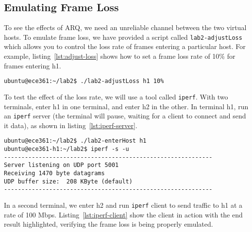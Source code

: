 \documentclass[11pt]{article}
\begin{document}

\subsection{Emulating Frame Loss}
To see the effects of ARQ, we need an unreliable channel between the two virtual hosts.
To emulate frame loss, we have provided a script called \texttt{lab2-adjustLoss} which allows you to control the loss rate of frames entering a particular host.
For example, listing~\ref{lst:adjust-loss} shows how to set a frame loss rate of 10\% for frames entering h1.


\begin{lstlisting}[style=ece361shell, caption={Emulating 10\% frame loss for frames entering h1.}, label={lst:adjust-loss}]
ubuntu@ece361:~/lab2$ ./lab2-adjustLoss h1 10%
\end{lstlisting}

To test the effect of the loss rate, we will use a tool called \texttt{iperf}.
With two terminals, enter h1 in one terminal, and enter h2 in the other.
In terminal h1, run an \texttt{iperf} server (the terminal will pause, waiting for a client to connect and send it data), as shown in listing~\ref{lst:iperf-server}.

\begin{lstlisting}[style=ece361shell, caption={Running an \texttt{iperf} server in h1.}, label={lst:iperf-server}]
ubuntu@ece361:~/lab2$ ./lab2-enterHost h1
ubuntu@ece361-h1:~/lab2$ iperf -s -u
------------------------------------------------------------
Server listening on UDP port 5001
Receiving 1470 byte datagrams
UDP buffer size:  208 KByte (default)
------------------------------------------------------------

\end{lstlisting}

In a second terminal, we enter h2 and run \texttt{iperf} client to send traffic to h1 at a rate of 100 Mbps.
Listing~\ref{lst:iperf-client} show the client in action with the end result highlighted, verifying the frame loss is being properly emulated.
\end{document}
